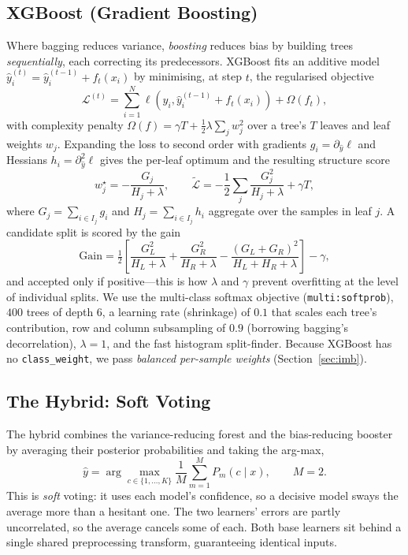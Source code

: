 \documentclass[conference]{IEEEtran}
\begin{document}
\subsection{XGBoost (Gradient Boosting)}
Where bagging reduces variance, \emph{boosting} reduces bias by building trees
\emph{sequentially}, each correcting its predecessors. XGBoost fits an additive
model $\hat{y}_i^{(t)}=\hat{y}_i^{(t-1)}+f_t(x_i)$ by minimising, at step $t$, the
regularised objective
\begin{equation}
\mathcal{L}^{(t)}=\sum_{i=1}^{N}\ell\!\left(y_i,\hat{y}_i^{(t-1)}+f_t(x_i)\right)
+\Omega(f_t),
\end{equation}
with complexity penalty $\Omega(f)=\gamma T+\tfrac{1}{2}\lambda\sum_j w_j^2$ over a
tree's $T$ leaves and leaf weights $w_j$. Expanding the loss to second order with
gradients $g_i=\partial_{\hat{y}}\ell$ and Hessians $h_i=\partial^2_{\hat{y}}\ell$
gives the per-leaf optimum and the resulting structure score
\begin{equation}
w_j^\star=-\frac{G_j}{H_j+\lambda},\qquad
\tilde{\mathcal{L}}=-\frac{1}{2}\sum_{j}\frac{G_j^2}{H_j+\lambda}+\gamma T,
\end{equation}
where $G_j=\sum_{i\in I_j}g_i$ and $H_j=\sum_{i\in I_j}h_i$ aggregate over the
samples in leaf $j$. A candidate split is scored by the gain
\begin{equation}
\mathrm{Gain}=\tfrac{1}{2}\!\left[\frac{G_L^2}{H_L+\lambda}+\frac{G_R^2}{H_R+\lambda}
-\frac{(G_L+G_R)^2}{H_L+H_R+\lambda}\right]-\gamma,
\end{equation}
and accepted only if positive---this is how $\lambda$ and $\gamma$ prevent
overfitting at the level of individual splits. We use the multi-class softmax
objective (\texttt{multi:softprob}), $400$ trees of depth $6$, a learning rate
(shrinkage) of $0.1$ that scales each tree's contribution, row and column
subsampling of $0.9$ (borrowing bagging's decorrelation), $\lambda{=}1$, and the
fast histogram split-finder. Because XGBoost has no \texttt{class\_weight}, we pass
\emph{balanced per-sample weights} (Section~\ref{sec:imb}).

\subsection{The Hybrid: Soft Voting}
The hybrid combines the variance-reducing forest and the bias-reducing booster by
averaging their posterior probabilities and taking the arg-max,
\begin{equation}
\hat{y}=\arg\max_{c\in\{1,\dots,K\}}\frac{1}{M}\sum_{m=1}^{M}P_m(c\mid x),
\qquad M=2.
\label{eq:soft}
\end{equation}
This is \emph{soft} voting: it uses each model's confidence, so a decisive model
sways the average more than a hesitant one. The two learners' errors are partly
uncorrelated, so the average cancels some of each. Both base learners sit behind a
single shared preprocessing transform, guaranteeing identical inputs.
\end{document}

